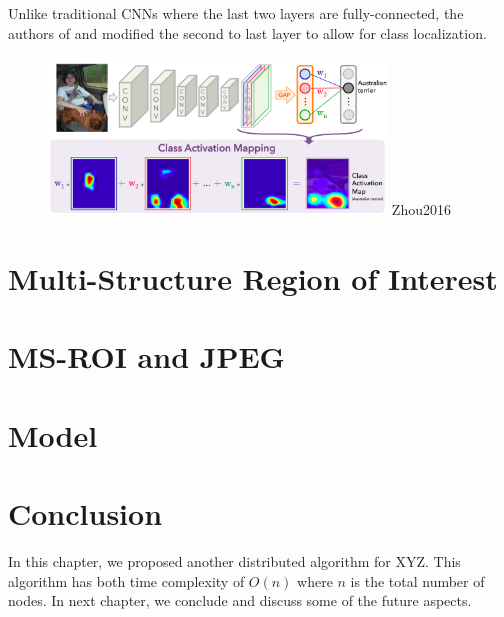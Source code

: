 Unlike traditional CNNs where the last two layers are fully-connected, the authors of \cite{Oquab2015} and \cite{Zhou2016} modified the second to last layer to allow for class localization.

\begin{figure}[!ht]
    \centering
    \includegraphics[width=0.80\textwidth]{fig/4-3.png}
    {Zhou2016 \cite{Zhou2016}}
    \label{fig:LeNet}
\end{figure}

\section{Multi-Structure Region of Interest}



\section{MS-ROI and JPEG}


\section{Model}

\section{Conclusion}
In this chapter, we proposed another distributed algorithm for
XYZ. This algorithm has both time complexity of $O(n)$ where $n$
is the total number of nodes.  In next chapter, we conclude and
discuss some of the future aspects.

